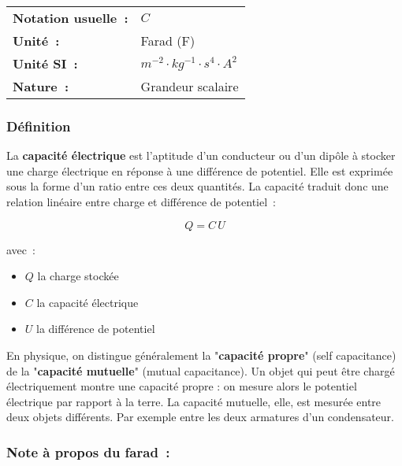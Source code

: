 \vspace{0.5cm}
\begin{tabular}{ll}
\textbf{Notation usuelle~:} & $C$ \\
\textbf{Unité~:} & Farad (F) \\
	\textbf{Unité SI~:} & $m^{-2} \cdot kg^{-1} \cdot {s}^{4} \cdot A^{2}$ \\
\textbf{Nature~:} & Grandeur scalaire \\
\end{tabular} 

\subsubsection*{Définition}

La \textbf{capacité électrique} est l'aptitude d'un conducteur ou d'un dipôle à stocker une charge électrique en réponse à une différence de potentiel. Elle est exprimée sous la forme d'un ratio entre ces deux quantités. La capacité traduit donc une relation linéaire entre charge et différence de potentiel~:

\begin{equation}
	Q = C\,U
\end{equation}

avec~:\\
\begin{itemize}
	\item $Q$ la charge stockée
	\item $C$ la capacité électrique
	\item $U$ la différence de potentiel\\
\end{itemize}

En physique, on distingue généralement la "\textbf{capacité propre}" (self capacitance) de la "\textbf{capacité mutuelle}" (mutual capacitance). Un objet qui peut être chargé électriquement montre une capacité propre : on mesure alors le potentiel électrique par rapport à la terre. La capacité mutuelle, elle, est mesurée entre deux objets différents. Par exemple entre les deux armatures d'un condensateur. 

\subsubsection{ Note à propos du farad~: }

